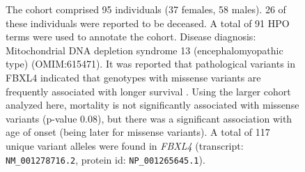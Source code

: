 \begin{figure}[htbp]
\caption{The cohort comprised 95 individuals (37 females, 58 males). 26 of these individuals were reported to be deceased. 
A total of 91 HPO terms were used to annotate the cohort. Disease diagnosis: Mitochondrial DNA depletion syndrome 13 (encephalomyopathic type)
 (OMIM:615471). It was reported that  pathological variants in FBXL4 indicated that genotypes with 
 missense variants are frequently associated with longer survival \cite{PMID_28940506}. Using the larger cohort analyzed here, mortality is not significantly associated with 
 missense variants (p-value 0.08), but there was a significant association with age of onset (being later for missense variants).
 A total of 117 unique variant alleles were found in \textit{FBXL4} (transcript: \texttt{NM\_001278716.2}, protein id: \texttt{NP\_001265645.1}).}
\end{figure}
